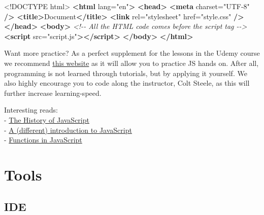 \documentclass[
]{book}
\newenvironment{Shaded}{\begin{snugshade}}{\end{snugshade}}
\newcommand{\CommentTok}[1]{\textcolor[rgb]{0.56,0.35,0.01}{\textit{#1}}}
\newcommand{\DataTypeTok}[1]{\textcolor[rgb]{0.13,0.29,0.53}{#1}}
\newcommand{\KeywordTok}[1]{\textcolor[rgb]{0.13,0.29,0.53}{\textbf{#1}}}
\newcommand{\NormalTok}[1]{#1}
\newcommand{\OtherTok}[1]{\textcolor[rgb]{0.56,0.35,0.01}{#1}}
\newcommand{\StringTok}[1]{\textcolor[rgb]{0.31,0.60,0.02}{#1}}
\begin{document}
\begin{Shaded}
\begin{Highlighting}[]
\DataTypeTok{\textless{}!DOCTYPE }\NormalTok{html}\DataTypeTok{\textgreater{}}
\KeywordTok{\textless{}html}\OtherTok{ lang=}\StringTok{"en"}\KeywordTok{\textgreater{}}
  \KeywordTok{\textless{}head\textgreater{}}
    \KeywordTok{\textless{}meta}\OtherTok{ charset=}\StringTok{"UTF{-}8"} \KeywordTok{/\textgreater{}}
    \KeywordTok{\textless{}title\textgreater{}}\NormalTok{Document}\KeywordTok{\textless{}/title\textgreater{}}
    \KeywordTok{\textless{}link}\OtherTok{ rel=}\StringTok{"stylesheet"}\OtherTok{ href=}\StringTok{"style.css"} \KeywordTok{/\textgreater{}}
  \KeywordTok{\textless{}/head\textgreater{}}
  \KeywordTok{\textless{}body\textgreater{}}
    \CommentTok{\textless{}!{-}{-} All the HTML code comes before the script tag {-}{-}\textgreater{}}
    \KeywordTok{\textless{}script}\OtherTok{ src=}\StringTok{"script.js"}\KeywordTok{\textgreater{}\textless{}/script\textgreater{}}
  \KeywordTok{\textless{}/body\textgreater{}}
\KeywordTok{\textless{}/html\textgreater{}}
\end{Highlighting}
\end{Shaded}

Want more practice? As a perfect supplement for the lessons in the Udemy course we recommend \href{https://learnjavascript.online/}{this website} as it will allow you to practice JS hands on. After all, programming is not learned through tutorials, but by applying it yourself. We also highly encourage you to code along the instructor, Colt Steele, as this will further increase learning-speed.

Interesting reads:\\
- \href{https://medium.com/@_benaston/lesson-1a-the-history-of-javascript-8c1ce3bffb17}{The History of JavaScript}\\
- \href{https://javascript.info/intro}{A (different) introduction to JavaScript}\\
- \href{https://javascript.info/function-basics}{Functions in JavaScript}

\hypertarget{tools}{%
\chapter{Tools}\label{tools}}

\hypertarget{ide}{%
\section{IDE}\label{ide}}
\end{document}
